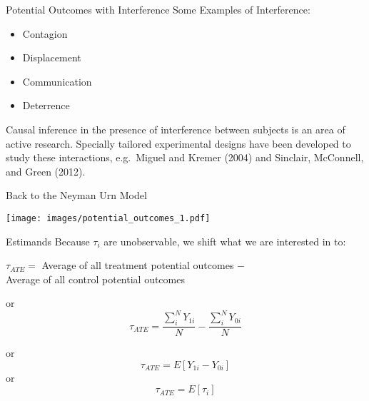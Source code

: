 \documentclass{beamer}
\numberwithin{equation}{section}
\begin{document}
\begin{frame}{Potential Outcomes with Interference}
\small
Some Examples of Interference:

\begin{itemize}
\itemsep1pt\parskip0pt
\item  Contagion
\item  Displacement
\item  Communication
\item   Deterrence
\end{itemize}

Causal inference in the presence of interference between subjects is an
area of active research. Specially tailored experimental designs have
been developed to study these interactions, e.g.~Miguel and Kremer
(2004) and Sinclair, McConnell, and Green (2012).

\end{frame}

\begin{frame}{Back to the Neyman Urn Model}

\centering
  \texttt{[image: images/potential\_outcomes\_1.pdf]}

\end{frame}

\begin{frame}{Estimands}
\small
Because $\tau_i$ are unobservable, we shift what we are interested in to:

\begin{definition}

   
    {\centering
 $\tau_{ATE} =$  Average of all treatment potential outcomes $-$\\ Average of all control potential outcomes
    
    or  
    $$\tau_{ATE} = \frac{\sum_i^N Y_{1i}}{N} - \frac{\sum_i^N Y_{0i}}{N} $$

    or
    $$ \tau_{ATE} = E[Y_{1i} - Y_{0i}]$$
    or
    $$ \tau_{ATE} = E[\tau_i]$$
    }
\end{definition}

\end{frame}
\end{document}
